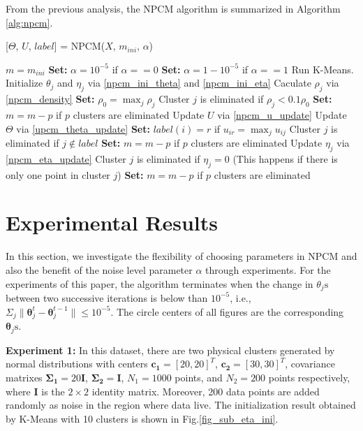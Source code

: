 \documentclass[journal]{IEEEtran}
\theoremstyle{definition}
\begin{document}
From the previous analysis, the NPCM algorithm is summarized in Algorithm \ref{alg:npcm}.
\begin{algorithm}
\caption{ [$\Theta$, $U$, $label$] = NPCM($X$, $m_{ini}$, $\alpha$)}
\label{alg:npcm}
\begin{algorithmic}[1]
\State $m=m_{ini}$
\State \textbf{Set:} $\alpha=10^{-5}$ if $\alpha==0$
\State \textbf{Set:} $\alpha=1-10^{-5}$ if $\alpha==1$
\State Run K-Means.
\State Initialize $\theta_j$ and $\eta_j$ via \eqref{npcm_ini_theta} and \eqref{npcm_ini_eta}
\State Caculate $\rho_j$ via \eqref{npcm_density}
\State \textbf{Set:} $\rho_0=\max_j\rho_j$
\State Cluster $j$ is eliminated if $\rho_j<0.1\rho_0$
\State \textbf{Set:} $m=m-p$ if $p$ clusters are eliminated
\Repeat
\State Update $U$ via \eqref{npcm_u_update}
\State Update $\Theta$ via \eqref{upcm_theta_update}
\State \textbf{Set:} $label(i)=r$ if $u_{ir}=\max_j u_{ij}$
\EndFor
\State Cluster $j$ is eliminated if $j \notin label$
\State \textbf{Set:} $m=m-p$ if  $p$ clusters are eliminated
\State Update $\eta_j$ via \eqref{npcm_eta_update}
\State Cluster $j$ is eliminated if $\eta_j=0$ (This happens if there is only one point in cluster $j$)
\State \textbf{Set:} $m=m-p$ if  $p$ clusters are eliminated
\\
\end{algorithmic}
\end{algorithm}
\section{Experimental Results}
\label{sec-4}
In this section, we investigate the flexibility of choosing parameters in NPCM and also the benefit of the noise level parameter $\alpha$ through experiments. For the experiments of this paper, the algorithm terminates when the change in $\theta_j\text{s}$ between two successive iterations is below than $10^{-5}$, i.e., $\Sigma_j\|\boldsymbol{\theta}_j^{t}-\boldsymbol{\theta}_j^{t-1}\|\leq10^{-5}$. The circle centers of all figures are the corresponding $\boldsymbol{\theta}_j\text{s}$.

\textbf{Experiment 1:} In this dataset, there are two physical clusters generated by normal distributions with centers $\mathbf{c_1}=[20, 20]^T$, $\mathbf{c_2}=[30, 30]^T$, covariance matrixes $\mathbf{\Sigma_1}=20\mathbf{I}$, $\mathbf{\Sigma_2}=\mathbf{I}$, $N_1=1000$ points, and $N_2=200$ points  respectively, where $\mathbf{I}$ is the $2\times 2$ identity matrix. Moreover, 200 data points are added randomly as noise in the region where data live. 
The initialization result obtained by K-Means with 10 clusters is shown in Fig.\ref{fig_sub_eta_ini}.
\end{document}
